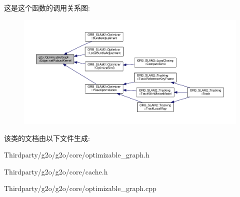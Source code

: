 这是这个函数的调用关系图\-:
\nopagebreak
\begin{figure}[H]
\begin{center}
\leavevmode
\includegraphics[width=350pt]{classg2o_1_1OptimizableGraph_1_1Edge_a42955172c19f16e2cfbb30d611d1bd87_icgraph}
\end{center}
\end{figure}




该类的文档由以下文件生成\-:\begin{DoxyCompactItemize}
\item 
Thirdparty/g2o/g2o/core/optimizable\-\_\-graph.\-h\item 
Thirdparty/g2o/g2o/core/cache.\-h\item 
Thirdparty/g2o/g2o/core/optimizable\-\_\-graph.\-cpp\end{DoxyCompactItemize}
